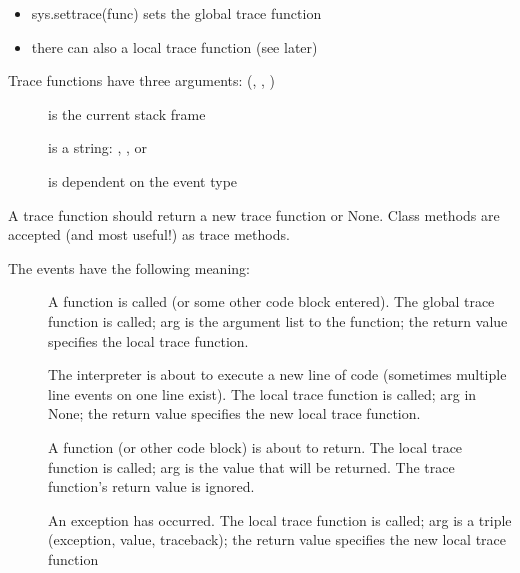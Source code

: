 \begin{itemize}
\item sys.settrace(func) sets the global trace function
\item there can also a local trace function (see later)
\end{itemize}

Trace functions have three arguments: (, , )

\begin{description}

\item[] is the current stack frame

\item[] is a string: , , 
or 

\item[] is dependent on the event type

\end{description}

A trace function should return a new trace function or None.
Class methods are accepted (and most useful!) as trace methods.

The events have the following meaning:

\begin{description}

\item[]
A function is called (or some other code block entered).  The global
trace function is called; arg is the argument list to the function;
the return value specifies the local trace function.

\item[]
The interpreter is about to execute a new line of code (sometimes
multiple line events on one line exist).  The local trace function is
called; arg in None; the return value specifies the new local trace
function.

\item[]
A function (or other code block) is about to return.  The local trace
function is called; arg is the value that will be returned.  The trace
function's return value is ignored.

\item[]
An exception has occurred.  The local trace function is called; arg is
a triple (exception, value, traceback); the return value specifies the
new local trace function

\end{description}

